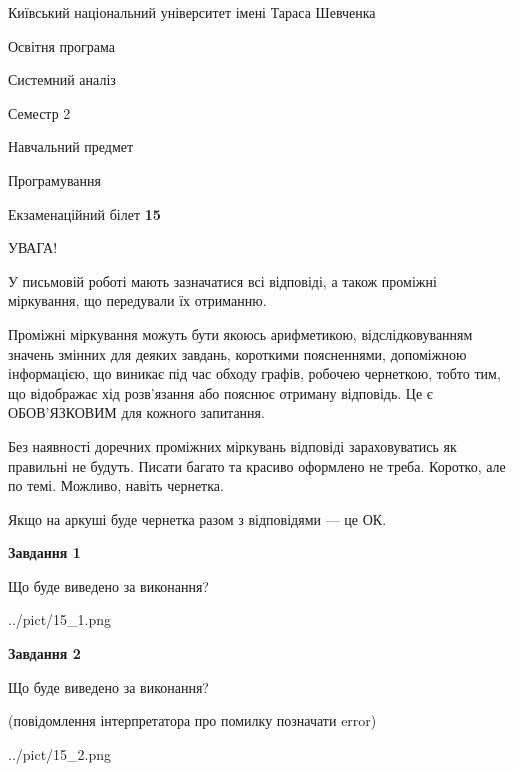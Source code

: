 \documentclass[12pt, ukrainian]{article}
\begin{document}
{{\begin {small}\par
{ \center  Київський національний університет імені Тараса Шевченка \par}
{\parbox {5 cm}{Освітня програма \hfill}{\parbox {7 cm}{Системний аналіз \hfill}}\parbox {6 cm}{\hfill Семестр 2}}\par
{\parbox {5 cm} {Навчальний предмет \hfill}\parbox {7 cm}{Програмування \hfill}\parbox {6cm}{\hfill}\par}\vspace{-7pt} \end{small}}{\center Екзаменаційний білет \No \textbf
{ 15 }\par}}
{
\begin {large}
УВАГА!

У письмовій роботі мають зазначатися всі відповіді, а також проміжні міркування, що передували їх отриманню.

Проміжні міркування можуть бути якоюсь арифметикою, відслідковуванням зна\-чень змінних для деяких завдань,
короткими поясненнями, допоміжною інформацією, що виникає під час обходу графів, робочею чернеткою,
тобто тим, що відображає хід розв’язання або пояснює отриману відповідь.
Це є ОБОВ’ЯЗКОВИМ для кожного запитання.

Без наявності доречних проміжних міркувань відповіді зараховуватись як правиль\-ні не будуть.
Писати багато та красиво оформлено не треба. Коротко, але по темі. Можли\-во, навіть чернетка.

Якщо на аркуші буде чернетка разом з відповідями --- це ОК.

\newpage

{\begin {center}\textbf{Завдання 1}\end {center}}\par
Що буде виведено за виконання?\par
\begin{center}
	{../pict/15_1.png}
\end{center}
\newpage

{\begin {center}\textbf{Завдання 2}\end {center}}\par
Що буде виведено за виконання?\par
 (повідомлення інтерпретатора про помилку позначати error)\par
\begin{center}
	{../pict/15_2.png}
\end{center}
\newpage


\end{large}}
\end{document}
